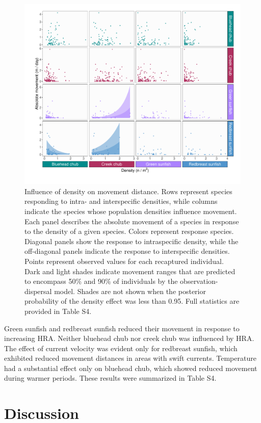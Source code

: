 \documentclass[11pt, class=article, crop=false]{standalone}
\begin{document}
\begin{figure}
    \centering
    \includegraphics[width=0.8\linewidth]{output/fig_density.pdf}
    \caption{Influence of density on movement distance. Rows represent species responding to intra- and interspecific densities, while columns indicate the species whose population densities influence movement. Each panel describes the absolute movement of a species in response to the density of a given species. Colors represent response species. Diagonal panels show the response to intraspecific density, while the off-diagonal panels indicate the response to interspecific densities. Points represent observed values for each recaptured individual. Dark and light shades indicate movement ranges that are predicted to encompass 50\% and 90\% of individuals by the observation-dispersal model. Shades are not shown when the posterior probability of the density effect was less than 0.95. Full statistics are provided in Table S4.}
    \label{fig:fig_density}
\end{figure}

Green sunfish and redbreast sunfish reduced their movement in response to increasing HRA. Neither bluehead chub nor creek chub was influenced by HRA. The effect of current velocity was evident only for redbreast sunfish, which exhibited reduced movement distances in areas with swift currents. Temperature had a substantial effect only on bluehead chub, which showed reduced movement during warmer periods. These results were summarized in  Table S4.

\section{Discussion}
\end{document}
